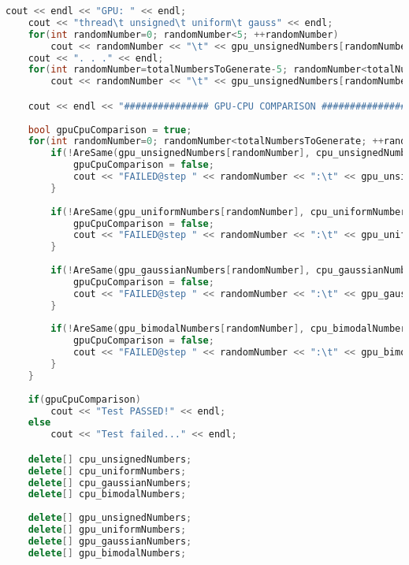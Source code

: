 \begin{lstlisting}[language=C++, caption={\texttt{libraries/CoreLibraries/RandomGenerator/OutputTest.cu}}]
	cout << endl << "GPU: " << endl;
	cout << "thread\t unsigned\t uniform\t gauss" << endl;
	for(int randomNumber=0; randomNumber<5; ++randomNumber)
		cout << randomNumber << "\t" << gpu_unsignedNumbers[randomNumber] << "\t" << gpu_uniformNumbers[randomNumber] << "\t" << gpu_gaussianNumbers[randomNumber] << "\t" << gpu_bimodalNumbers[randomNumber] << endl;
	cout << ". . ." << endl;	
	for(int randomNumber=totalNumbersToGenerate-5; randomNumber<totalNumbersToGenerate; ++randomNumber)
		cout << randomNumber << "\t" << gpu_unsignedNumbers[randomNumber] << "\t" << gpu_uniformNumbers[randomNumber] << "\t" << gpu_gaussianNumbers[randomNumber] << "\t" << gpu_bimodalNumbers[randomNumber] << endl;

	cout << endl << "############### GPU-CPU COMPARISON ################" << endl << endl;
	
	bool gpuCpuComparison = true;
	for(int randomNumber=0; randomNumber<totalNumbersToGenerate; ++randomNumber){
		if(!AreSame(gpu_unsignedNumbers[randomNumber], cpu_unsignedNumbers[randomNumber])){
			gpuCpuComparison = false;
			cout << "FAILED@step " << randomNumber << ":\t" << gpu_unsignedNumbers[randomNumber] << "\t" << cpu_unsignedNumbers[randomNumber] << endl;
		}
		
		if(!AreSame(gpu_uniformNumbers[randomNumber], cpu_uniformNumbers[randomNumber])){
			gpuCpuComparison = false;
			cout << "FAILED@step " << randomNumber << ":\t" << gpu_uniformNumbers[randomNumber] << "\t" << cpu_uniformNumbers[randomNumber] << endl;
		}
		
		if(!AreSame(gpu_gaussianNumbers[randomNumber], cpu_gaussianNumbers[randomNumber])){
			gpuCpuComparison = false;
			cout << "FAILED@step " << randomNumber << ":\t" << gpu_gaussianNumbers[randomNumber] << "\t" << cpu_gaussianNumbers[randomNumber] << endl;
		}
		
		if(!AreSame(gpu_bimodalNumbers[randomNumber], cpu_bimodalNumbers[randomNumber])){
			gpuCpuComparison = false;
			cout << "FAILED@step " << randomNumber << ":\t" << gpu_bimodalNumbers[randomNumber] << "\t" << cpu_bimodalNumbers[randomNumber] << endl;
		}
	}
	
	if(gpuCpuComparison)
		cout << "Test PASSED!" << endl;
	else
		cout << "Test failed..." << endl;

	delete[] cpu_unsignedNumbers;
	delete[] cpu_uniformNumbers;
	delete[] cpu_gaussianNumbers;
	delete[] cpu_bimodalNumbers;
	
	delete[] gpu_unsignedNumbers;
	delete[] gpu_uniformNumbers;
	delete[] gpu_gaussianNumbers;
	delete[] gpu_bimodalNumbers;


\end{lstlisting}
